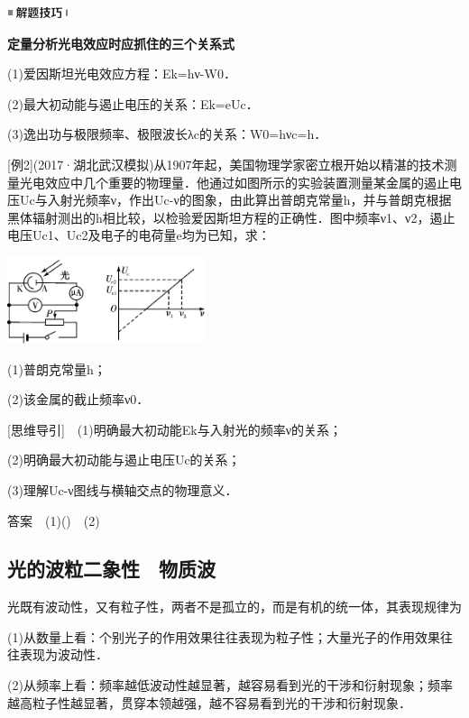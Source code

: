 \begin{center}
  \includegraphics[width=0.70764in,height=0.12292in]{media/image37.png}
\end{center}
\begin{center}
  \textbf{定量分析光电效应时应抓住的三个关系式}
\end{center}

(1)爱因斯坦光电效应方程：Ek=hν-W0．

(2)最大初动能与遏止电压的关系：Ek=eUc．

(3)逸出功与极限频率、极限波长λc的关系：W0=hνc=h．

{[}例2{]}(2017·湖北武汉模拟)从1907年起，美国物理学家密立根开始以精湛的技术测量光电效应中几个重要的物理量．他通过如图所示的实验装置测量某金属的遏止电压Uc与入射光频率ν，作出Uc-ν的图象，由此算出普朗克常量h，并与普朗克根据黑体辐射测出的h相比较，以检验爱因斯坦方程的正确性．图中频率ν1、ν2，遏止电压Uc1、Uc2及电子的电荷量e均为已知，求：

\begin{center}\includegraphics[width=2.28333in,height=1in]{media/image473.png}\end{center}
(1)普朗克常量h；

(2)该金属的截止频率ν0．

{[}思维导引{]}　(1)明确最大初动能Ek与入射光的频率ν的关系；

(2)明确最大初动能与遏止电压Uc的关系；

(3)理解Uc-ν图线与横轴交点的物理意义．

答案　(1)()　(2)
\newpage
\subsection{光的波粒二象性　物质波}

光既有波动性，又有粒子性，两者不是孤立的，而是有机的统一体，其表现规律为

(1)从数量上看：个别光子的作用效果往往表现为粒子性；大量光子的作用效果往往表现为波动性．

(2)从频率上看：频率越低波动性越显著，越容易看到光的干涉和衍射现象；频率越高粒子性越显著，贯穿本领越强，越不容易看到光的干涉和衍射现象．

